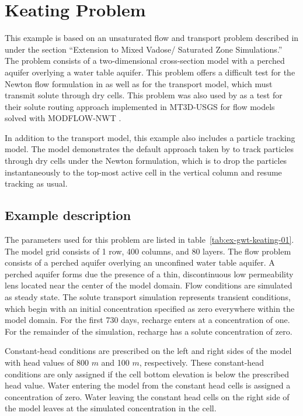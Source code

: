 \section{Keating Problem}

This example is based on an unsaturated flow and transport problem described in \cite{keating2009stable} under the section ``Extension to Mixed Vadose/ Saturated Zone Simulations.''  The problem consists of a two-dimensional cross-section model with a perched aquifer overlying a water table aquifer.  This problem offers a difficult test for the Newton flow formulation in \mf as well as for the transport model, which must transmit solute through dry cells.  This problem was also used by \cite{mt3dusgs} as a test for their solute routing approach implemented in MT3D-USGS for flow models solved with MODFLOW-NWT \citep{modflownwt}.

In addition to the transport model, this example also includes a particle tracking model.  The model demonstrates the default approach taken by \mf to track particles through dry cells under the Newton formulation, which is to drop the particles instantaneously to the top-most active cell in the vertical column and resume tracking as usual.

\subsection{Example description}

The parameters used for this problem are listed in table~\ref{tab:ex-gwt-keating-01}.  The model grid consists of 1 row, 400 columns, and 80 layers.  The flow problem consists of a perched aquifer overlying an unconfined water table aquifer.  A perched aquifer forms due the presence of a thin, discontinuous low permeability lens located near the center of the model domain.  Flow conditions are simulated as steady state.  The solute transport simulation represents transient conditions, which begin with an initial concentration specified as zero everywhere within the model domain.  For the first 730 days, recharge enters at a concentration of one.  For the remainder of the simulation, recharge has a solute concentration of zero.

Constant-head conditions are prescribed on the left and right sides of the model with head values of 800 $m$ and 100 $m$, respectively.  These constant-head conditions are only assigned if the cell bottom elevation is below the prescribed head value.  Water entering the model from the constant head cells is assigned a concentration of zero.  Water leaving the constant head cells on the right side of the model leaves at the simulated concentration in the cell.  

